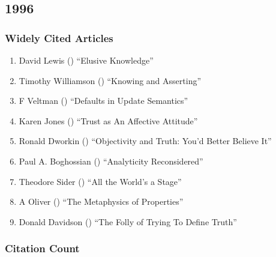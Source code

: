\documentclass[
  10pt,
  letterpaper,
  DIV=11,
  numbers=noendperiod,
  twoside]{scrartcl}
\providecommand{\tightlist}{%
  \setlength{\itemsep}{0pt}\setlength{\parskip}{0pt}}\usepackage{longtable,booktabs,array}
\begin{document}
\newpage

\subsection{1996}\label{sec-s1996}

\subsubsection*{Widely Cited Articles}\label{widely-cited-articles-39}

\begin{enumerate}
\def\labelenumi{\arabic{enumi}.}
\tightlist
\item
  David Lewis () ``Elusive
  Knowledge''
\item
  Timothy Williamson () ``Knowing
  and Asserting''
\item
  F Veltman () ``Defaults in
  Update Semantics''
\item
  Karen Jones () ``Trust as An
  Affective Attitude''
\item
  Ronald Dworkin () ``Objectivity
  and Truth: You'd Better Believe It''
\item
  Paul A. Boghossian ()
  ``Analyticity Reconsidered''
\item
  Theodore Sider () ``All the
  World's a Stage''
\item
  A Oliver () ``The Metaphysics
  of Properties''
\item
  Donald Davidson () ``The Folly
  of Trying To Define Truth''
\end{enumerate}

\subsubsection*{Citation Count}\label{sec-count-1996}
\end{document}
